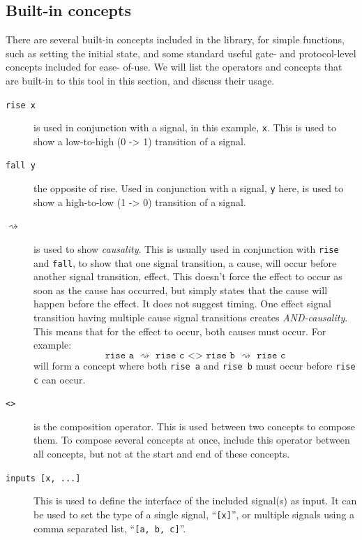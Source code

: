\documentclass{proc}
\begin{document}
\subsection{Built-in concepts \label{sub:built-in_concepts}}

There are several built-in concepts included in the library, for simple functions, such as setting the initial state, and some standard useful gate- and protocol-level concepts included for ease-
of-use. We will list the operators and concepts that are built-in to this tool in this section, and discuss their usage. 

\begin{description}
  \item [\texttt{rise x}] is used in conjunction with a signal, in this example, \texttt{x}. This is used to show a low-to-high (0 -> 1) transition of a signal.
  
  \item [\texttt{fall y}] the opposite of rise. Used in conjunction with a signal, \texttt{y} here,  is used to show a high-to-low (1 -> 0) transition of a signal.
  
  \item [$\rightsquigarrow$] is used to show \emph{causality}. This is usually used in conjunction with \texttt{rise} and \texttt{fall}, to show that one signal transition, a cause, will occur 
   before another signal transition, effect. This doesn't force the effect to occur as soon as the cause has occurred, but simply states that the cause will happen before the effect. It does 
   not suggest timing. One effect signal transition having multiple cause signal transitions creates \emph{AND-causality}. This means that for the effect to occur, both causes must occur. For 
   example: 
   \[
   \texttt{rise a $\rightsquigarrow$ rise c <> rise b $\rightsquigarrow$ rise c}
   \]
   will form a concept where both \texttt{rise a} and \texttt{rise b} must occur before \texttt{rise c} can occur.
   
   \item [\texttt{<>}] is the composition operator. This is used between two concepts to compose them. To compose several concepts at once, include this operator between all concepts, 
   but not at the start and end of these concepts. 
   
   \item [\texttt{inputs [x, ...]}] This is used to define the interface of the included signal(s) as input. It can be used to set the type of a single signal, ``\texttt{[x]}'', or multiple signals using 
   a comma separated list, ``\texttt{[a, b, c]}''.
   

\end{description}
\end{document}
